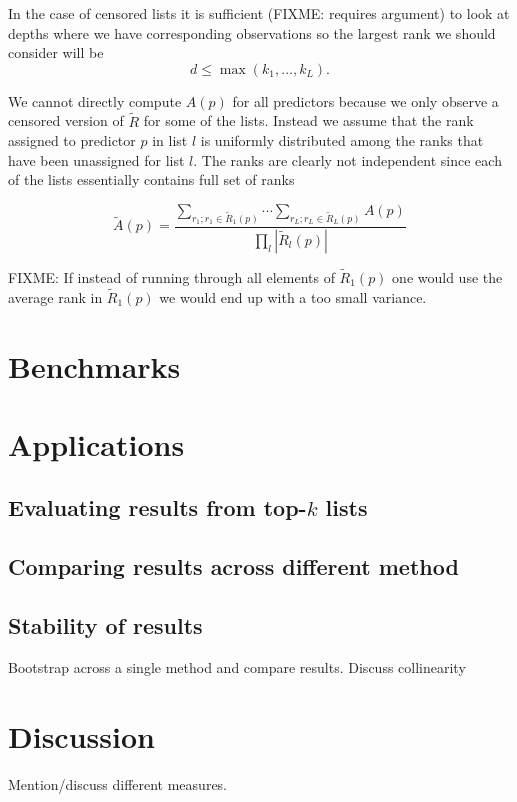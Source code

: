 \documentclass[12pt,a4paper]{article}\usepackage[]{graphicx}\usepackage[]{color}
\begin{document}
In the case of censored lists it is sufficient (FIXME: requires
argument) to look at depths where we have corresponding observations
so the largest rank we should consider will be
\begin{equation}
d \leq \max(k_1, \ldots, k_L).
\end{equation}

We cannot directly compute $A(p)$ for all predictors because we only observe a censored version of $\tilde R$ for some of the lists. Instead we assume that the rank assigned to predictor $p$ in list $l$ is uniformly distributed among the ranks that have been unassigned for list $l$. The ranks are clearly not independent since each of the lists essentially contains full set of ranks 

\begin{equation}
\tilde A(p) = \frac{\sum_{r_1; r_1\in \tilde R_1(p)}  \cdots \sum_{r_L; r_L\in \tilde R_L(p)} A(p)}{\prod_l |\tilde R_l(p)|}
\end{equation}

FIXME: If instead of running through all elements of $\tilde R_1(p)$
one would use the average rank in $\tilde R_1(p)$ we would end up with
a too small variance.

\section{Benchmarks}

\section{Applications}

\subsection{Evaluating results from top-$k$ lists}

\subsection{Comparing results across different method}

\subsection{Stability of results}

Bootstrap across a single method and compare results. Discuss collinearity

\section{Discussion}

Mention/discuss different measures. 
\end{document}
